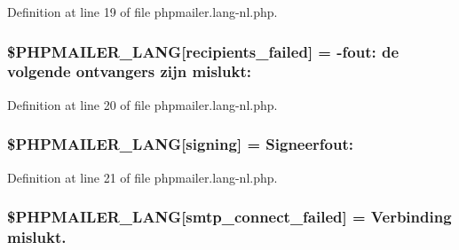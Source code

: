 Definition at line 19 of file phpmailer.\+lang-\/nl.\+php.

\subsubsection[{\texorpdfstring{\$\+P\+H\+P\+M\+A\+I\+L\+E\+R\+\_\+\+L\+A\+NG}{$PHPMAILER_LANG}}]{\setlength{\rightskip}{0pt plus 5cm}\$P\+H\+P\+M\+A\+I\+L\+E\+R\+\_\+\+L\+A\+NG\mbox{[}\textquotesingle{}recipients\+\_\+failed\textquotesingle{}\mbox{]} = -\/fout\+: de volgende ontvangers zijn mislukt\+: \textquotesingle{}}\hypertarget{phpmailer_8lang-nl_8php_a7589d30bb9b368327c2df015f3e6bcba}{}\label{phpmailer_8lang-nl_8php_a7589d30bb9b368327c2df015f3e6bcba}


Definition at line 20 of file phpmailer.\+lang-\/nl.\+php.

\subsubsection[{\texorpdfstring{\$\+P\+H\+P\+M\+A\+I\+L\+E\+R\+\_\+\+L\+A\+NG}{$PHPMAILER_LANG}}]{\setlength{\rightskip}{0pt plus 5cm}\$P\+H\+P\+M\+A\+I\+L\+E\+R\+\_\+\+L\+A\+NG\mbox{[}\textquotesingle{}signing\textquotesingle{}\mbox{]} = \textquotesingle{}Signeerfout\+: \textquotesingle{}}\hypertarget{phpmailer_8lang-nl_8php_a68e437bdb9b968a5a67320f03d231565}{}\label{phpmailer_8lang-nl_8php_a68e437bdb9b968a5a67320f03d231565}


Definition at line 21 of file phpmailer.\+lang-\/nl.\+php.

\subsubsection[{\texorpdfstring{\$\+P\+H\+P\+M\+A\+I\+L\+E\+R\+\_\+\+L\+A\+NG}{$PHPMAILER_LANG}}]{\setlength{\rightskip}{0pt plus 5cm}\$P\+H\+P\+M\+A\+I\+L\+E\+R\+\_\+\+L\+A\+NG\mbox{[}\textquotesingle{}smtp\+\_\+connect\+\_\+failed\textquotesingle{}\mbox{]} =  Verbinding mislukt.\textquotesingle{}}\hypertarget{phpmailer_8lang-nl_8php_a7b321d4ca1e9df702403ed4c61aa0980}{}\label{phpmailer_8lang-nl_8php_a7b321d4ca1e9df702403ed4c61aa0980}


